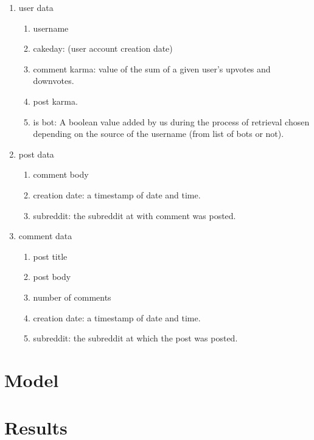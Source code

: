 \documentclass{article}
\begin{document}
    \begin{enumerate}
        \item user data
            \begin{enumerate}
                \item username
                \item cakeday: (user account creation date)
                \item comment karma: value of the sum of a given user's upvotes and downvotes.
                \item post karma.
                \item is bot: A boolean value added by us during the process of retrieval chosen depending on the source of the username (from list of bots or not).
            \end{enumerate}
        \item post data
            \begin{enumerate}
                \item comment body
                \item creation date: a timestamp of date and time.
                \item subreddit: the subreddit at with comment was posted.
            \end{enumerate}
        \item comment data
            \begin{enumerate}
                \item post title
                \item post body
                \item number of comments
                \item creation date: a timestamp of date and time.
                \item subreddit: the subreddit at which the post was posted.
            \end{enumerate}
    \end{enumerate}
\section{Model}

\section{Results}
\end{document}
